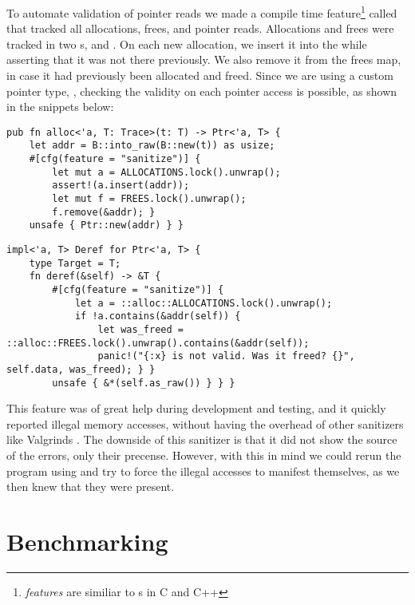 To automate validation of pointer reads we made a compile time feature\footnote{\emph{features} are
similiar to s in C and C++} called  that tracked all allocations,
frees, and pointer reads.  Allocations and frees were tracked in two s,
 and .  On each new allocation, we insert it into the 
while asserting that it was not there previously. We also remove it from the frees map, in case it
had previously been allocated and freed. Since we are using a custom pointer type, ,
checking the validity on each pointer access is possible, as shown in the snippets below:

\begin{lstlisting}[style=Rust]
pub fn alloc<'a, T: Trace>(t: T) -> Ptr<'a, T> {
    let addr = B::into_raw(B::new(t)) as usize;
    #[cfg(feature = "sanitize")] {
        let mut a = ALLOCATIONS.lock().unwrap();
        assert!(a.insert(addr));
        let mut f = FREES.lock().unwrap();
        f.remove(&addr); }
    unsafe { Ptr::new(addr) } } \end{lstlisting}

\begin{lstlisting}[style=Rust]
impl<'a, T> Deref for Ptr<'a, T> {
    type Target = T;
    fn deref(&self) -> &T {
        #[cfg(feature = "sanitize")] {
            let a = ::alloc::ALLOCATIONS.lock().unwrap();
            if !a.contains(&addr(self)) {
                let was_freed = ::alloc::FREES.lock().unwrap().contains(&addr(self));
                panic!("{:x} is not valid. Was it freed? {}", self.data, was_freed); } }
        unsafe { &*(self.as_raw()) } } }
\end{lstlisting}


This feature was of great help during development and testing, and it quickly reported illegal
memory accesses, without having the overhead of other sanitizers like Valgrinds .
The downside of this sanitizer is that it did not show the source of the errors, only their
precense. However, with this in mind we could rerun the program using  and try to
force the illegal accesses to manifest themselves, as we then knew that they were present.



\section{Benchmarking\label{sec:methods-benchmarking}}

